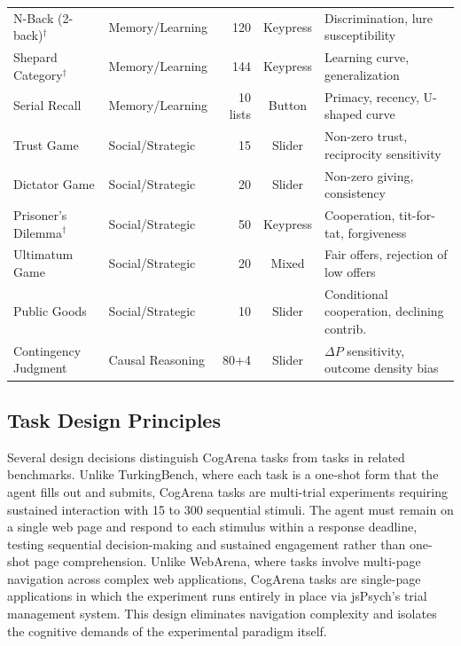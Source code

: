 \documentclass{article}
\begin{document}
\begin{table}[t]
{\begin{tabular}{@{}llrcl@{}}
\midrule
N-Back (2-back)$^\dagger$ & Memory/Learning & 120 & Keypress & Discrimination, lure susceptibility \\
Shepard Category$^\dagger$ & Memory/Learning & 144 & Keypress & Learning curve, generalization \\
Serial Recall & Memory/Learning & 10 lists & Button & Primacy, recency, U-shaped curve \\
\midrule
Trust Game & Social/Strategic & 15 & Slider & Non-zero trust, reciprocity sensitivity \\
Dictator Game & Social/Strategic & 20 & Slider & Non-zero giving, consistency \\
Prisoner's Dilemma$^\dagger$ & Social/Strategic & 50 & Keypress & Cooperation, tit-for-tat, forgiveness \\
Ultimatum Game & Social/Strategic & 20 & Mixed & Fair offers, rejection of low offers \\
Public Goods & Social/Strategic & 10 & Slider & Conditional cooperation, declining contrib. \\
\midrule
Contingency Judgment & Causal Reasoning & 80+4 & Slider & $\Delta P$ sensitivity, outcome density bias \\
\bottomrule
\end{tabular}%
}
\end{table}

\subsection{Task Design Principles}
\label{sec:design}

Several design decisions distinguish CogArena tasks from tasks in related benchmarks. Unlike TurkingBench, where each task is a one-shot form that the agent fills out and submits, CogArena tasks are multi-trial experiments requiring sustained interaction with 15 to 300 sequential stimuli. The agent must remain on a single web page and respond to each stimulus within a response deadline, testing sequential decision-making and sustained engagement rather than one-shot page comprehension. Unlike WebArena, where tasks involve multi-page navigation across complex web applications, CogArena tasks are single-page applications in which the experiment runs entirely in place via jsPsych's trial management system. This design eliminates navigation complexity and isolates the cognitive demands of the experimental paradigm itself.
\end{document}
